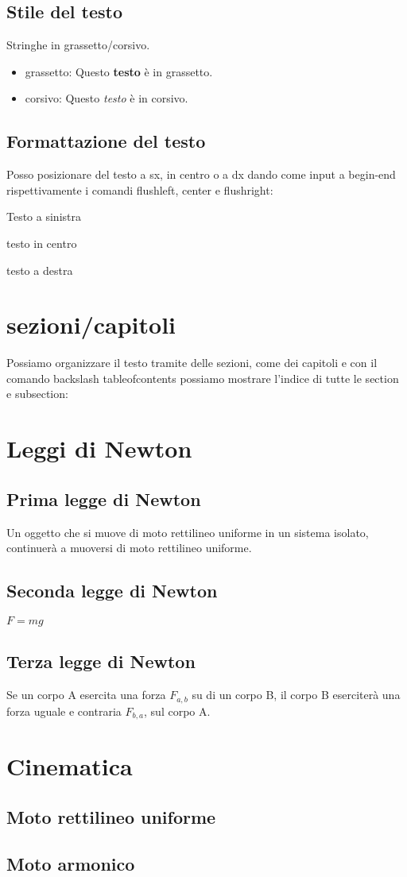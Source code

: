 \documentclass[11pt]{article}
\begin{document}
\subsection{Stile del testo}
Stringhe in grassetto/corsivo.
\begin{itemize}
\item grassetto: Questo \textbf{testo} è in grassetto.
\item corsivo: Questo \textit{testo} è in corsivo.
\end{itemize}
\subsection{Formattazione del testo}
Posso posizionare del testo a sx, 
in centro o a dx dando come input a begin-end rispettivamente i comandi flushleft, 
center e flushright: 
\\
\begin{flushleft}
    Testo a sinistra
\end{flushleft}
\begin{center}
    testo in centro
\end{center}
\begin{flushright}
    testo a destra
\end{flushright}
\section{sezioni/capitoli}
Possiamo organizzare il testo tramite delle sezioni, come dei capitoli e con il comando backslash 
tableofcontents possiamo mostrare l'indice di tutte le section e subsection:\\
\section{Leggi di Newton}
    \subsection{Prima legge di Newton}
    Un oggetto che si muove di moto rettilineo uniforme in un sistema isolato, continuerà a muoversi di moto rettilineo uniforme.
    \subsection{Seconda legge di Newton}
    $F=mg$
    \subsection{Terza legge di Newton}
    Se un corpo A esercita una forza $F_{a,b}$ su di un corpo B, il corpo B eserciterà 
    una forza uguale e contraria $F_{b,a}$, sul corpo A.
\section{Cinematica}
    \subsection{Moto rettilineo uniforme}
    \subsection{Moto armonico}
\end{document}
